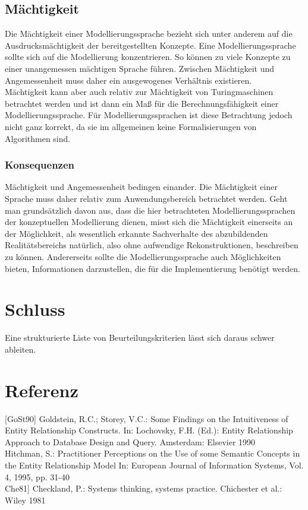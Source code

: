 \subsection{Mächtigkeit}
Die Mächtigkeit einer Modellierungssprache bezieht sich unter anderem auf die Ausdrucksmächtigkeit
der bereitgestellten Konzepte. Eine Modellierungssprache sollte sich auf die Modellierung konzentrieren.
So können zu viele Konzepte zu einer unangemessen mächtigen Sprache führen. Zwischen Mächtigkeit
und Angemessenheit muss daher ein ausgewogenes Verhältnis existieren.\\
Mächtigkeit kann aber auch relativ zur Mächtigkeit von Turingmaschinen betrachtet werden und ist
dann ein Maß für die Berechnungsfähigkeit einer Modellierungssprache. Für Modellierungssprachen
ist diese Betrachtung jedoch nicht ganz korrekt, da sie im allgemeinen keine Formalisierungen von
Algorithmen sind.
\subsubsection{Konsequenzen}
Mächtigkeit und Angemessenheit bedingen einander. Die Mächtigkeit einer Sprache muss daher relativ
zum Anwendungsbereich betrachtet werden. Geht man grundsätzlich davon aus, dass die hier betrachteten
Modellierungssprachen der konzeptuellen Modellierung dienen, misst sich die Mächtigkeit einerseits
an der Möglichkeit, als wesentlich erkannte Sachverhalte des abzubildenden Realitätsbereichs
natürlich, also ohne aufwendige Rekonstruktionen, beschreiben zu können. Andererseits sollte die
Modellierungssprache auch Möglichkeiten bieten, Informationen darzustellen, die für die Implementierung
benötigt werden.


\section{Schluss}
Eine strukturierte Liste von Beurteilungskriterien lässt sich daraus schwer ableiten.

\section{Referenz}
[GoSt90] Goldstein, R.C.; Storey, V.C.: Some Findings on the Intuitiveness of Entity Relationship Constructs.
In: Lochovsky, F.H. (Ed.): Entity Relationship Approach to Database Design and
Query. Amsterdam: Elsevier 1990 \\
[Hit95] Hitchman, S.: Practitioner Perceptions on the Use of some Semantic Concepts in the Entity
Relationship Model In: European Journal of Information Systems, Vol. 4, 1995, pp. 31-40\\
Che81] Checkland, P.: Systems thinking, systems practice. Chichester et al.: Wiley 1981\\
